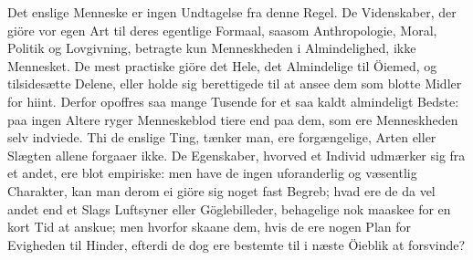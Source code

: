 \documentclass[12pt,a4paper]{article}
\newcommand{\opage}[1]{\marginnote{\footnotesize\textit{[#1]}}}
\begin{document}
Det enslige Menneske er ingen Undtagelse fra denne Regel. De
Videnskaber, der giöre vor egen Art til deres egentlige Formaal, saasom
Anthropologie, Moral, Politik og Lovgivning, betragte kun Menneskheden i
Almindelighed, ikke Mennesket. De mest practiske giöre det Hele, det
Almindelige til Öiemed, og tilsidesætte Delene, eller holde sig
berettigede til at ansee dem som blotte Midler for hiint. Derfor opoffres
saa mange Tusende for et saa kaldt almindeligt Bedste: paa ingen Altere
ryger Menneskeblod tiere end paa dem, som ere Menneskheden
\opage{227} selv indviede. Thi de enslige Ting, tænker man, ere forgængelige, Arten
eller Slægten allene forgaaer ikke. De Egenskaber, hvorved et Individ
udmærker sig fra et andet, ere blot empiriske: men have de ingen
uforanderlig og væsentlig Charakter, kan man derom ei giöre sig noget
fast Begreb; hvad ere de da vel andet end et Slags Luftsyner eller
Göglebilleder, behagelige nok maaskee for en kort Tid at anskue; men
hvorfor skaane dem, hvis de ere nogen Plan for Evigheden til Hinder,
efterdi de dog ere bestemte til i næste Öieblik at forsvinde?
\end{document}

